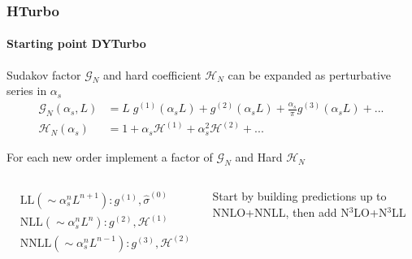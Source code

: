 \documentclass[aspectratio=43]{beamer}
\begin{document}
\begin{frame}

	\frametitle{HTurbo}
	\framesubtitle{Starting point DYTurbo}

	\footnotesize
	
	Sudakov factor $\mathcal{G}_{N}$ and hard coefficient $\mathcal{H}_{N}$ can be expanded as perturbative series in $\alpha_{s}$
	\begin{align}
		\mathcal{G}_{N}(\alpha_{s}, L) &= L\;g^{(1)}(\alpha_{s}L) + g^{(2)}(\alpha_{s}L) + \frac{\alpha_{s}}{\pi}g^{(3)}(\alpha_{s}L) + ... \nonumber \\
		\mathcal{H}_{N}(\alpha_{s}) &= 1 + \alpha_{s}\mathcal{H}^{(1)} + \alpha_{s}^{2}\mathcal{H}^{(2)} + ...  \nonumber
	\end{align}
	
	For each new order implement a factor of $\mathcal{G}_{N}$ and Hard $\mathcal{H}_{N}$
	
	\begin{columns}
		

		\begin{align}
			&\textrm{LL} (\sim \alpha_{s}^{n}L^{n+1}): g^{(1)}, \hat{\sigma}^{(0)} \nonumber \\
			&\textrm{NLL} (\sim \alpha_{s}^{n}L^{n}): g^{(2)}, \mathcal{H}^{(1)} \nonumber \\
			&\textrm{NNLL} (\sim \alpha_{s}^{n}L^{n-1}): g^{(3)}, \mathcal{H}^{(2)} \nonumber
		\end{align}
	
		
		Start by building predictions up to NNLO+NNLL, then add {\color{blue}N$^{3}$LO+N$^{3}$LL}
		
	\end{columns}

\end{frame}
\end{document}
